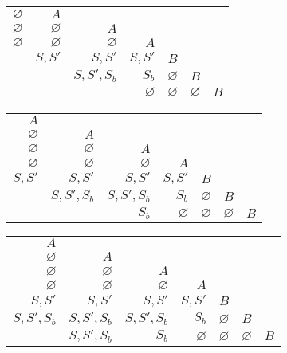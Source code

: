 \documentclass[12pt]{article}
\newenvironment{Problems}{
	\begin{enumerate}[]
	}{       
	\end{enumerate}
}
\begin{document}
\begin{Problems}
\begin{center}
\begin{tabular}{|r|r|r|r|r|r|r|}
			\cline{1-2}
			$\varnothing$ & $A$\\
			\cline{1-3}
			$\varnothing$ & $\varnothing$ & $A$\\
			\cline{1-4}
			$\varnothing$ & $\varnothing$ & $\varnothing$ & $A$\\
			\cline{1-5}
			& $S, S'$ & $S, S'$ & $S, S'$ & $B$\\
			\cline{1-6}
			& & $S, S', S_b$ & $S_b$ & $\varnothing$ & $B$\\
			\hline
			& & & $\varnothing$ & $\varnothing$ & $\varnothing$ & $B$\\
			\hline
		\end{tabular}
	\end{center}
	\begin{center}
		\begin{tabular}{|r|r|r|r|r|r|r|}
			\cline{1-1}
			$A$\\
			\cline{1-2}
			$\varnothing$ & $A$\\
			\cline{1-3}
			$\varnothing$ & $\varnothing$ & $A$\\
			\cline{1-4}
			$\varnothing$ & $\varnothing$ & $\varnothing$ & $A$\\
			\cline{1-5}
			$S, S'$ & $S, S'$ & $S, S'$ & $S, S'$ & $B$\\
			\cline{1-6}
			& $S, S', S_b$ & $S, S', S_b$ & $S_b$ & $\varnothing$ & $B$\\
			\hline
			& & $S_b$ & $\varnothing$ & $\varnothing$ & $\varnothing$ & $B$\\
			\hline
		\end{tabular}
	\end{center}
	\begin{center}
		\begin{tabular}{|r|r|r|r|r|r|r|}
			\cline{1-1}
			$A$\\
			\cline{1-2}
			$\varnothing$ & $A$\\
			\cline{1-3}
			$\varnothing$ & $\varnothing$ & $A$\\
			\cline{1-4}
			$\varnothing$ & $\varnothing$ & $\varnothing$ & $A$\\
			\cline{1-5}
			$S, S'$ & $S, S'$ & $S, S'$ & $S, S'$ & $B$\\
			\cline{1-6}
			$S, S', S_b$ & $S, S', S_b$ & $S, S', S_b$ & $S_b$ & $\varnothing$ & $B$\\
			\hline
			& $S, S', S_b$ & $S_b$ & $\varnothing$ & $\varnothing$ & $\varnothing$ & $B$\\
			\hline
		\end{tabular}
	\end{center}

\end{Problems}
\end{document}
